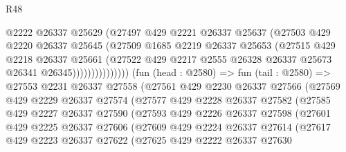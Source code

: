 \begin{lexlean}{R48}
\begin{coremodule}
                            @2222
                            @26337
                            @25629
                            (@27497
                              @429
                              @2221
                              @26337
                              @25637
                              (@27503
                                @429
                                @2220
                                @26337
                                @25645
                                (@27509
                                  @1685
                                  @2219
                                  @26337
                                  @25653
                                  (@27515
                                    @429
                                    @2218
                                    @26337
                                    @25661
                                    (@27522
                                      @429
                                      @2217
                                      @2555
                                      @26328
                                      @26337
                                      @25673
                                      @26341
                                      @26345)))))))))))))))
        (fun (head : @2580) =>
        fun (tail : @2580) =>
        @27553
          @2231
          @26337
          @27558
          (@27561
            @429
            @2230
            @26337
            @27566
            (@27569
              @429
              @2229
              @26337
              @27574
              (@27577
                @429
                @2228
                @26337
                @27582
                (@27585
                  @429
                  @2227
                  @26337
                  @27590
                  (@27593
                    @429
                    @2226
                    @26337
                    @27598
                    (@27601
                      @429
                      @2225
                      @26337
                      @27606
                      (@27609
                        @429
                        @2224
                        @26337
                        @27614
                        (@27617
                          @429
                          @2223
                          @26337
                          @27622
                          (@27625
                            @429
                            @2222
                            @26337
                            @27630

\end{coremodule}
\end{lexlean}

